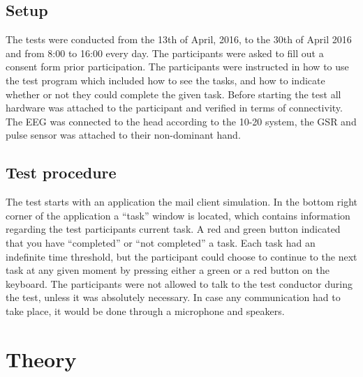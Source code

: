 \subsection{Setup}
The tests were conducted from the 13th of April, 2016, to the 30th of April 2016 and from 8:00 to 16:00 every day. 
The participants were asked to fill out a consent form prior participation. 
The participants were instructed in how to use the test program which included how to see the tasks, and how to indicate whether or not they could complete the given task. 
Before starting the test all hardware was attached to the participant and verified in terms of connectivity. 
The EEG was connected to the head according to the 10-20 system\cite{eeg_tech_10_20}, the GSR and pulse sensor was attached to their non-dominant hand. 

\subsection{Test procedure}
The test starts with an application the mail client simulation.
In the bottom right corner of the application a ``task'' window is located, which contains information regarding the test participants current task. 
A red and green button indicated that you have ``completed'' or ``not completed'' a task.  
Each task had an indefinite time threshold, but the participant could choose to continue to the next task at any given moment by pressing either a green or a red button on the keyboard. 
The participants were not allowed to talk to the test conductor during the test, unless it was absolutely necessary. 
In case any communication had to take place, it would be done through a microphone and speakers.


\section{Theory}
